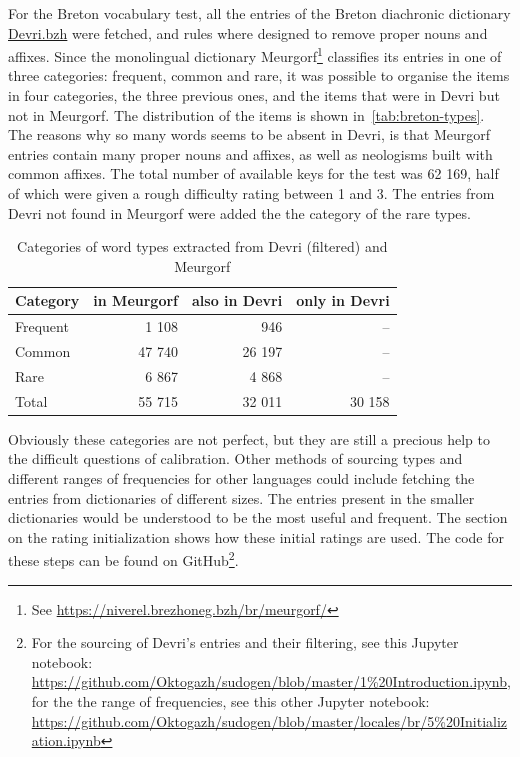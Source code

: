 For the Breton vocabulary test, all the entries of the Breton diachronic dictionary \href{https://devri.bzh/}{Devri.bzh} were fetched, and rules where designed to remove proper nouns and affixes. Since the monolingual dictionary Meurgorf\footnote{See \url{https://niverel.brezhoneg.bzh/br/meurgorf/}} classifies its entries in one of three categories: frequent, common and rare, it was possible to organise the items in four categories, the three previous ones, and the items that were in Devri but not in Meurgorf. The distribution of the items is shown in~\ref{tab:breton-types}. The reasons why so many words seems to be absent in Devri, is that Meurgorf entries contain many proper nouns and affixes, as well as neologisms built with common affixes. The total number of available keys for the test was 62 169, half of which were given a rough difficulty rating between 1 and 3. The entries from Devri not found in Meurgorf were added the the category of the rare types.

\begin{table}[htbp]
    \centering
    \begin{tabular}{l|r|r|r}
        \textbf{Category} & \textbf{in Meurgorf} & \textbf{also in Devri} & \textbf{only in Devri} \\
        \hline
        Frequent & 1 108 & 946 & – \\
        Common & 47 740 & 26 197 & – \\
        Rare & 6 867 & 4 868 & – \\
        Total & 55 715 & 32 011 & 30 158 \\
    \end{tabular}
    \caption{Categories of word types extracted from Devri (filtered) and Meurgorf}
\end{table}\label{tab:breton-types}

Obviously these categories are not perfect, but they are still a precious help to the difficult questions of calibration. Other methods of sourcing types and different ranges of frequencies for other languages could include fetching the entries from dictionaries of different sizes. The entries present in the smaller dictionaries would be understood to be the most useful and frequent. The section on the rating initialization shows how these initial ratings are used. The code for these steps can be found on GitHub\footnote{For the sourcing of Devri's entries and their filtering, see this Jupyter notebook: \url{https://github.com/Oktogazh/sudogen/blob/master/1\%20Introduction.ipynb}, for the the range of frequencies, see this other Jupyter notebook: \url{https://github.com/Oktogazh/sudogen/blob/master/locales/br/5\%20Initialization.ipynb}}.

